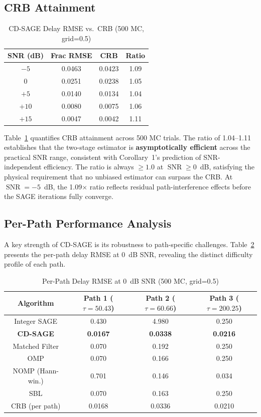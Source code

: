 \documentclass[a4paper,fleqn]{cas-dc}
\DeclareMathOperator{\SNR}{SNR}
\begin{document}
\subsection{CRB Attainment}

\begin{table}[cols=4,pos=htbp]
\centering
\caption{CD-SAGE Delay RMSE vs.\ CRB (500 MC, grid=0.5)}
\label{tab:crb}
\small
\begin{tabular}{@{}cccc@{}}
\toprule
SNR (dB) & Frac RMSE & CRB & Ratio \\
\midrule
$-5$ & 0.0463 & 0.0423 & 1.09 \\
$0$  & 0.0251 & 0.0238 & 1.05 \\
$+5$ & 0.0140 & 0.0134 & 1.04 \\
$+10$& 0.0080 & 0.0075 & 1.06 \\
$+15$& 0.0047 & 0.0042 & 1.11 \\
\bottomrule
\end{tabular}
\end{table}

Table~\ref{tab:crb} quantifies CRB attainment across 500 MC trials. The ratio of 1.04--1.11 establishes that the two-stage estimator is \textbf{asymptotically efficient} across the practical SNR range, consistent with Corollary~1's prediction of SNR-independent efficiency. The ratio is always $\ge 1.0$ at $\SNR \ge 0$~dB, satisfying the physical requirement that no unbiased estimator can surpass the CRB. At $\SNR = -5$~dB, the 1.09$\times$ ratio reflects residual path-interference effects before the SAGE iterations fully converge.

\subsection{Per-Path Performance Analysis}

A key strength of CD-SAGE is its robustness to path-specific challenges. Table~\ref{tab:perpath} presents the per-path delay RMSE at 0~dB SNR, revealing the distinct difficulty profile of each path.

\begin{table}[cols=4,pos=htbp]
\centering
\caption{Per-Path Delay RMSE at 0~dB SNR (500 MC, grid=0.5)}
\label{tab:perpath}
\small
\begin{tabular}{@{}cccc@{}}
\toprule
Algorithm & Path 1 ($\tau{=}50.43$) & Path 2 ($\tau{=}60.66$) & Path 3 ($\tau{=}200.25$) \\
\midrule
Integer SAGE & 0.430 & 4.980 & 0.250 \\
\textbf{CD-SAGE} & \textbf{0.0167} & \textbf{0.0338} & \textbf{0.0216} \\
Matched Filter & 0.070 & 0.192 & 0.250 \\
OMP & 0.070 & 0.166 & 0.250 \\
NOMP (Hann-win.) & 0.701 & 0.146 & 0.034 \\
SBL & 0.070 & 0.163 & 0.250 \\
\midrule
CRB (per path) & 0.0168 & 0.0336 & 0.0210 \\
\bottomrule
\end{tabular}
\end{table}
\end{document}

